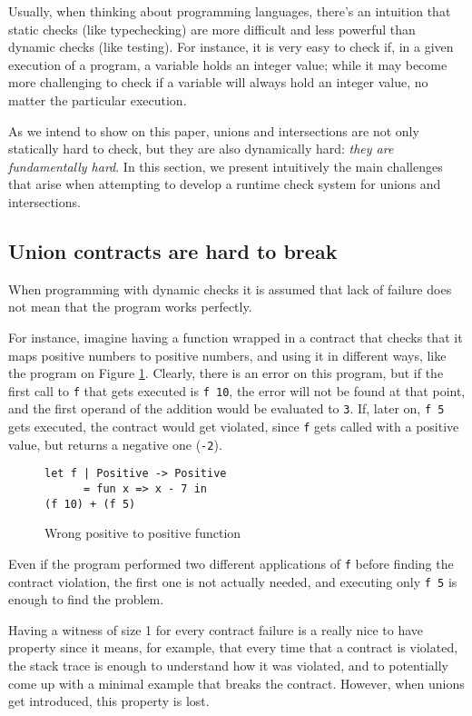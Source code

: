 \documentclass[sigplan,10pt,review,anonymous]{acmart}
\newcommand{\nickel}[1]{\lstinline[language=nickel]{#1}}
\begin{document}
Usually, when thinking about programming languages, there's an intuition
that static checks (like typechecking) are more difficult and less powerful
than dynamic checks (like testing).
For instance, it is very easy to check if,
in a given execution of a program, a variable holds an integer value; while it
may become more challenging to check if a variable will always hold an integer value,
no matter the particular execution.

As we intend to show on this paper, unions and intersections are not only
statically hard to check, but they are also dynamically hard:
\emph{they are fundamentally hard}.
In this section, we present intuitively the main challenges that arise
when attempting to develop a runtime check system for unions and intersections.

\subsection*{Union contracts are hard to break}

When programming with dynamic checks it is assumed that lack of
failure does not mean that the program works perfectly.

For instance, imagine having a function wrapped in a contract
that checks that it maps positive numbers to positive numbers,
and using it in different ways,
like the program on Figure \ref{fig:pos-to-pos}.
Clearly, there is an error on this program, but if the first call
to \nickel{f} that gets executed is \nickel{f 10}, the error will not
be found at that point, and the first operand of the addition would be
evaluated to \nickel{3}.
If, later on, \nickel{f 5} gets executed, the contract would get violated,
since \nickel{f} gets called with a positive value, but returns a negative
one (\nickel{-2}).

\begin{figure}[h]
\begin{lstlisting}[language=nickel]
let f | Positive -> Positive
      = fun x => x - 7 in
(f 10) + (f 5)
\end{lstlisting}
\caption{Wrong positive to positive function}
\label{fig:pos-to-pos}
\end{figure}

Even if the program performed two different applications of \nickel{f}
before finding the contract violation, the first one is not actually
needed, and executing only \nickel{f 5} is enough to find the problem.

Having a witness of size 1 for every contract failure is a really nice to have property
since it means, for example, that every time that a contract is violated,
the stack trace is enough to understand how it was violated, and to potentially
come up with a minimal example that breaks the contract.
However, when unions get introduced, this property is lost.
\end{document}
